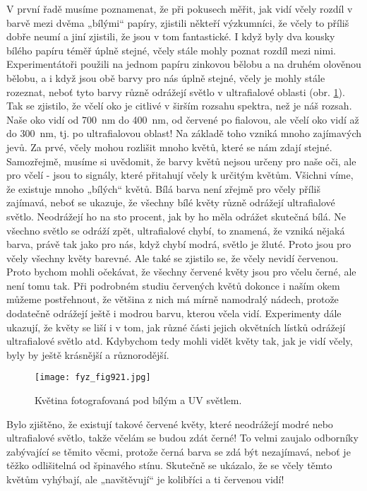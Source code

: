     V první řadě musíme poznamenat, že při pokusech měřit, jak vidí včely rozdíl v barvě mezi dvěma
    „bílými“ papíry, zjistili někteří výzkumníci, že včely to příliš dobře neumí a jiní zjistili, že
    jsou v tom fantastické. I když byly dva kousky bílého papíru téměř úplně stejné, včely stále
    mohly poznat rozdíl mezi nimi. Experimentátoři použili na jednom papíru zinkovou bělobu a na
    druhém olověnou bělobu, a i když jsou obě barvy pro nás úplně stejné, včely je mohly stále
    rozeznat, neboť tyto barvy různě odrážejí světlo v ultrafialové oblasti (obr. \ref{fyz:fig921}).
    Tak se zjistilo, že včelí oko je citlivé v širším rozsahu spektra, než je náš rozsah. Naše oko
    vidí od \SI{700}{\nm} do \SI{400}{\nm}, od červené po fialovou, ale včelí oko vidí až do
    \SI{300}{\nm}, tj. po ultrafialovou oblast! Na základě toho vzniká mnoho zajímavých jevů. Za
    prvé, včely mohou rozlišit mnoho květů, které se nám zdají stejné. Samozřejmě, musíme si
    uvědomit, že barvy květů nejsou určeny pro naše oči, ale pro včelí - jsou to signály, které
    přitahují včely k určitým květům. Všichni víme, že existuje mnoho „bílých“ květů. Bílá barva
    není zřejmě pro včely příliš zajímavá, neboť se ukazuje, že všechny bílé květy různě odrážejí
    ultrafialové světlo. Neodrážejí ho na sto procent, jak by ho měla odrážet skutečná bílá. Ne
    všechno světlo se odráží zpět, ultrafialové chybí, to znamená, že vzniká nějaká barva, právě tak
    jako pro nás, když chybí modrá, světlo je žluté. Proto jsou pro včely všechny květy barevné. Ale
    také se zjistilo se, že včely nevidí červenou. Proto bychom mohli očekávat, že všechny červené
    květy jsou pro včelu černé, ale není tomu tak. Při podrobném studiu červených květů dokonce i
    naším okem můžeme postřehnout, že většina z nich má mírně namodralý nádech, protože dodatečně
    odrážejí ještě i modrou barvu, kterou včela vidí. Experimenty dále ukazují, že květy se liší i v
    tom, jak různé části jejich okvětních lístků odrážejí ultrafialové světlo atd. Kdybychom tedy
    mohli vidět květy tak, jak je vidí včely, byly by ještě krásnější a různorodější.

    \begin{figure}[ht!] %
      \centering
      \texttt{[image: fyz\_fig921.jpg]}
      \caption{Květina fotografovaná pod bílým a UV světlem.}
      \label{fyz:fig921}
    \end{figure}
    
    Bylo zjištěno, že existují takové červené květy, které neodrážejí modré nebo ultrafialové
    světlo, takže včelám se budou zdát černé! To velmi zaujalo odborníky zabývající se těmito věcmi,
    protože černá barva se zdá být nezajímavá, neboť je těžko odlišitelná od špinavého stínu.
    Skutečně se ukázalo, že se včely těmto květům vyhýbají, ale „navštěvují“ je kolibříci a ti
    červenou vidí!

